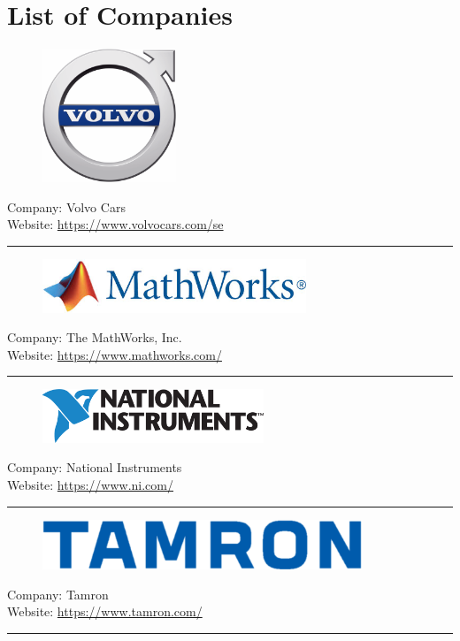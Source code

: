 \chapter{List of Companies}
\label{AppendixListOfCompanies}

\begin{figure}[h!]
\includegraphics[height=4cm]{Pictures/AppVolvoLogo}
\end{figure}
\vspace{3mm}
Company: Volvo Cars\\
Website: \url{https://www.volvocars.com/se}
\vspace{5mm}
\hrule
\vspace{10mm}

\begin{figure}[h!]
\includegraphics[height=1.6cm]{Pictures/AppMathworksLogo}
\end{figure}
\vspace{3mm}
Company: The MathWorks, Inc.\\
Website: \url{https://www.mathworks.com/}
\vspace{5mm}
\hrule
\vspace{10mm}

\begin{figure}[h!]
\includegraphics[height=1.6cm]{Pictures/AppNationalInstrumentLogo}
\end{figure}
\vspace{3mm}
Company: National Instruments\\ 
Website: \url{https://www.ni.com/}
\vspace{5mm}
\hrule
\vspace{10mm}

\newpage
\begin{figure}[h!]
\includegraphics[height=1.5cm]{Pictures/AppTamronLogo}
\end{figure}
\vspace{3mm}
Company: Tamron\\
Website: \url{https://www.tamron.com/}
\vspace{5mm}
\hrule
\vspace{10mm}

